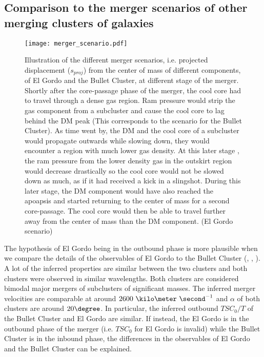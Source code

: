 \subsection{Comparison to the merger scenarios of other merging clusters of galaxies}

\begin{figure}
	\texttt{[image: merger\_scenario.pdf]}
	\caption{Illustration of the different merger scenarios, i.e. projected displacement
		($s_{proj}$) from the center of mass of different components, of El
		Gordo and the Bullet Cluster, at different stage of the merger.  
		Shortly after the core-passage
		phase of the merger, the cool core had to travel through a dense gas region.
		Ram pressure would strip the gas component from a subcluster and cause the
		cool core to lag behind the DM peak (This corresponds to the scenario
		for the Bullet Cluster). As time went by, the DM and the cool core of
		a subcluster would propagate outwards while slowing down, they would
		encounter a region with much lower gas density. At this later stage
		, the ram pressure from the lower density gas in the
		outskirt region would decrease drastically so the cool core would not be slowed
		down as much, as if it had received a kick in a slingshot. During this
		later stage, the DM component would have also reached the
		apoapsis and started returning to the center of mass for a second
		core-passage. The cool core would then be able to travel further away from
		the center of mass than the DM component. (El Gordo scenario)
	\label{fig:merger_scenario}}
\end{figure}
The hypothesis of El Gordo being in the outbound phase is more plausible when
we compare the details of the observables of El Gordo to the Bullet
Cluster (\citealt{Bradac2006b}, \citealt{Springel2007},
\citealt{Mastropietro2008a}).
A lot of the inferred properties are similar between the two clusters and
both clusters were observed in similar wavelengths. Both clusters are
considered bimodal major mergers of subclusters of significant masses. The inferred
merger velocities are comparable at around $2600~\kilo\meter~\second^{-1}$
and $\alpha$ of both clusters are around $20 \degree$. 
In particular, the inferred outbound $TSC_0 / T$ of the Bullet Cluster and El Gordo
are similar. If instead, the El Gordo
is in the outbound phase of the merger (i.e. $TSC_0$ for El Gordo is
invalid) while the Bullet Cluster is in the inbound phase, the differences
in the observables of El Gordo and the Bullet Cluster can be explained.\par
